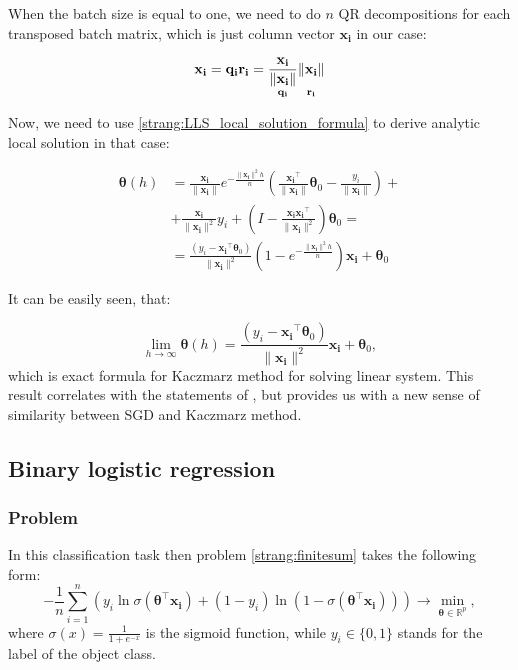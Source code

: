 \documentclass{article}
\newcommand{\vect}[1]{\boldsymbol{\mathbf{#1}}}
\begin{document}
When the batch size is equal to one, we need to do $n$ QR decompositions for each transposed batch matrix, which is just column vector $\vect{x_i}$ in our case:

\begin{equation}
\vect{x_i} = \vect{q_i} \vect{r_i} = \underset{\vect{q_i} }{\frac{\vect{x_i}}{\|\vect{x_i}\|}} \underset{\vect{r_i}}{\vphantom{\frac{\vect{x_i}}{\|\vect{x_i}\|}} \|\vect{x_i}\|}
\end{equation}

Now, we need to use \eqref{strang:LLS_local_solution_formula} to derive analytic local solution in that case:

\begin{equation*}
\begin{split}
\vect{\theta}(h) &= \frac{\vect{x_i}}{\|\vect{x_i}\|} e^{-\frac{\|\vect{x_i}\|^2 h}{n}} \left( \frac{\vect{x_i}^\top}{\|\vect{x_i}\|} \vect{\theta}_0 - \frac{y_i}{\|\vect{x_i}\|}\right) + \\ &+ \frac{\vect{x_i}}{\|\vect{x_i}\|^2}y_i + \left(I - \frac{\vect{x_i}\vect{x_i}^\top}{\|\vect{x_i}\|^2}\right)\vect{\theta}_0 = \\
&= \frac{\left(y_i -\vect{x_i}^\top\vect{\theta}_0 \right)}{\|\vect{x_i}\|^2}  \left(1 - e^{-\frac{\|\vect{x_i}\|^2 h}{n}}\right)\vect{x_i} + \vect{\theta}_0
\end{split}
\end{equation*}

It can be easily seen, that:

\begin{equation}
\label{strang:splitting_limit_kaczmarz}
\lim_{h \to \infty} \vect{\theta}(h) = \frac{\left(y_i - \vect{x_i}^\top\vect{\theta}_0 \right)}{\|\vect{x_i}\|^2} \vect{x_i} + \vect{\theta}_0,
\end{equation}
which is exact formula for Kaczmarz method for solving linear system. This result correlates with the statements of \citet{needell2014stochastic}, but provides us with a new sense of similarity between SGD and Kaczmarz method.

\subsection{Binary logistic regression}
\subsubsection{Problem}
In this classification task then problem \eqref{strang:finitesum} takes the following form:
\begin{equation}\label{strang:LogReg}
-\frac{1}{n} \sum_{i=1}^n\left(y_i \ln \sigma(\vect{\theta}^\top\vect{x_i})  + (1-y_i) \ln (1-\sigma(\vect{\theta}^\top\vect{x_i}))\right) \to \min_{\vect{\theta} \in \mathbb{R}^p},
\end{equation}
where $\sigma(x) = \frac{1}{1 + e^{-x}}$ is the sigmoid function, while $ y_i \in \{0,1\}$ stands for the label of the object class.
\end{document}
